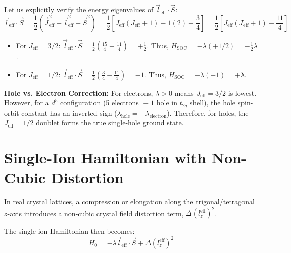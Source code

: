 \documentclass[11pt,a4paper]{article}
\begin{document}
\begin{mathwarning}
    Let us explicitly verify the energy eigenvalues of $\vec{l}_{\text{eff}} \cdot \vec{S}$:
    \begin{equation}
        \vec{l}_{\text{eff}} \cdot \vec{S} = \frac{1}{2} \left( \vec{J}_{\text{eff}}^2 - \vec{l}_{\text{eff}}^2 - \vec{S}^2 \right) = \frac{1}{2} \left[ J_{\text{eff}}(J_{\text{eff}}+1) - 1(2) - \frac{3}{4} \right] = \frac{1}{2} \left[ J_{\text{eff}}(J_{\text{eff}}+1) - \frac{11}{4} \right]
    \end{equation}
    \begin{itemize}
        \item For $J_{\text{eff}} = 3/2$: $\vec{l}_{\text{eff}} \cdot \vec{S} = \frac{1}{2} \left( \frac{15}{4} - \frac{11}{4} \right) = +\frac{1}{2}$. Thus, $H_{\text{SOC}} = -\lambda (+1/2) = -\frac{1}{2}\lambda$.
        \item For $J_{\text{eff}} = 1/2$: $\vec{l}_{\text{eff}} \cdot \vec{S} = \frac{1}{2} \left( \frac{3}{4} - \frac{11}{4} \right) = -1$. Thus, $H_{\text{SOC}} = -\lambda (-1) = +\lambda$.
    \end{itemize}
    \textbf{Hole vs. Electron Correction:} For electrons, $\lambda > 0$ means $J_{\text{eff}} = 3/2$ is lowest. However, for a $d^5$ configuration (5 electrons $\equiv 1$ hole in $t_{2g}$ shell), the hole spin-orbit constant has an inverted sign ($\lambda_{\text{hole}} = -\lambda_{\text{electron}}$). Therefore, for holes, the $J_{\text{eff}} = 1/2$ doublet forms the true single-hole ground state.
\end{mathwarning}

\section{Single-Ion Hamiltonian with Non-Cubic Distortion}

In real crystal lattices, a compression or elongation along the trigonal/tetragonal $z$-axis introduces a non-cubic crystal field distortion term, $\Delta (l_{z}^{\text{eff}})^2$.

The single-ion Hamiltonian then becomes:
\begin{equation}
    H_0 = -\lambda \vec{l}_{\text{eff}} \cdot \vec{S} + \Delta (l_z^{\text{eff}})^2
\end{equation}
\end{document}
